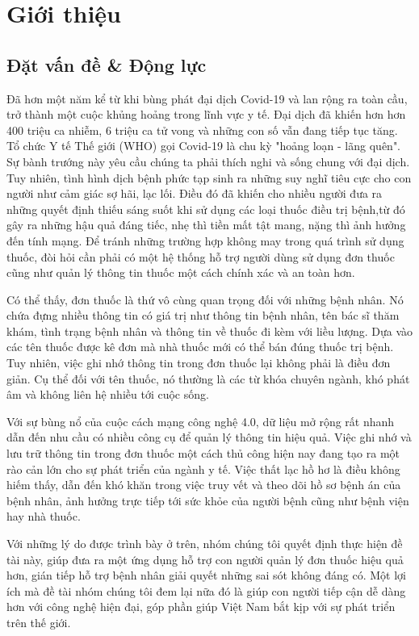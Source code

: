 \chapter{Giới thiệu}
\label{Chapter1}

\section{Đặt vấn đề \& Động lực}

Đã hơn một năm kể từ khi bùng phát đại dịch Covid-19 và lan rộng ra toàn cầu, trở thành
một cuộc khủng hoảng trong lĩnh vực y tế. Đại dịch đã khiến hơn hơn 400 triệu ca nhiễm, 6
triệu ca tử vong và những con số vẫn đang tiếp tục tăng. Tổ chức Y tế Thế giới (WHO) gọi
Covid-19 là chu kỳ "hoảng loạn - lãng quên". Sự bành trướng này yêu cầu chúng ta phải
thích nghi và sống chung với đại dịch. Tuy nhiên, tình hình dịch bệnh phức tạp sinh ra
những suy nghĩ tiêu cực cho con người như cảm giác sợ hãi, lạc lối. Điều đó đã khiến cho
nhiều người đưa ra những quyết định thiếu sáng suốt khi sử dụng các loại thuốc điều trị
bệnh,từ đó gây ra những hậu quả đáng tiếc, nhẹ thì tiền mất tật mang, nặng thì ảnh hưởng
đến tính mạng. Để tránh những trường hợp không may trong quá trình sử dụng thuốc, đòi
hỏi cần phải có một hệ thống hỗ trợ người dùng sử dụng đơn thuốc cũng như quản lý thông
tin thuốc một cách chính xác và an toàn hơn.

Có thể thấy, đơn thuốc là thứ vô cùng quan trọng đối với những bệnh nhân. Nó chứa đựng
nhiều thông tin có giá trị như thông tin bệnh nhân, tên bác sĩ thăm khám, tình trạng bệnh
nhân và thông tin về thuốc đi kèm với liều lượng. Dựa vào các tên thuốc được kê đơn mà
nhà thuốc mới có thể bán đúng thuốc trị bệnh. Tuy nhiên, việc ghi nhớ thông tin trong đơn thuốc lại không phải là điều đơn giản. Cụ thể đối với tên thuốc, nó thường là các từ khóa
chuyên ngành, khó phát âm và không liên hệ nhiều tới cuộc sống.

Với sự bùng nổ của cuộc cách mạng công nghệ 4.0, dữ liệu mở rộng rất nhanh dẫn đến nhu
cầu có nhiều công cụ để quản lý thông tin hiệu quả. Việc ghi nhớ và lưu trữ thông tin trong
đơn thuốc một cách thủ công hiện nay đang tạo ra một rào cản lớn cho sự phát triển của
ngành y tế. Việc thất lạc hồ hơ là điều không hiếm thấy, dẫn đến khó khăn trong việc truy vết
và theo dõi hồ sơ bệnh án của bệnh nhân, ảnh hưởng trực tiếp tới sức khỏe của người
bệnh cũng như bệnh viện hay nhà thuốc.

Với những lý do được trình bày ở trên, nhóm chúng tôi quyết định thực hiện đề tài này, giúp
đưa ra một ứng dụng hỗ trợ con người quản lý đơn thuốc hiệu quả hơn, gián tiếp hỗ trợ
bệnh nhân giải quyết những sai sót không đáng có. Một lợi ích mà đề tài nhóm chúng tôi
đem lại nữa đó là giúp con người tiếp cận dễ dàng hơn với công nghệ hiện đại, góp phần
giúp Việt Nam bắt kịp với sự phát triển trên thế giới.

